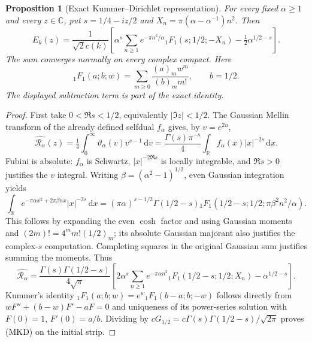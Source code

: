 \documentclass[11pt]{article}
\newtheorem{proposition}[theorem]{Proposition}
\theoremstyle{remark}\newtheorem{remark}[theorem]{Remark}
\newcommand{\R}{\mathbb R}
\newcommand{\C}{\mathbb C}
\newcommand{\dd}{\,\mathrm d}
\begin{document}
\begin{proposition}[Exact Kummer--Dirichlet representation]
\label{prop:mehler-kummer}
For every fixed $\alpha\ge1$ and every $z\in\C$, put
$s=1/4-iz/2$ and $X_n=\pi(\alpha-\alpha^{-1})n^2$. Then
\[
 E_k(z)=\frac1{\sqrt2c(k)}
 \left[\alpha^s\sum_{n\ge1}e^{-\pi n^2/\alpha}
   {}_1F_1(s;1/2;-X_n)-\tfrac12\alpha^{1/2-s}\right]. \tag{MKD}
\]
The sum converges normally on every complex compact. Here
\[
 {}_1F_1(a;b;w)=\sum_{m\ge0}\frac{(a)_m w^m}{(b)_m m!},
 \qquad b=1/2.
\]
The displayed subtraction term is part of the exact identity.
\end{proposition}
\begin{proof}
First take $0<\Re s<1/2$, equivalently $|\Im z|<1/2$.
The Gaussian Mellin transform of the already defined selfdual
$f_\alpha$ gives, by $v=e^{2u}$,
\[
 \widehat{\mathcal R_\alpha}(z)
 =\tfrac14\int_0^\infty\vartheta_\alpha(v)v^{s-1}\dd v
 =\frac{\Gamma(s)\pi^{-s}}4
                     \int_\R f_\alpha(x)|x|^{-2s}\dd x .
\]
Fubini is absolute: $f_\alpha$ is Schwartz, $|x|^{-2\Re s}$ is
locally integrable, and $\Re s>0$ justifies the $v$ integral.
Writing $\beta=(\alpha^2-1)^{1/2}$, even Gaussian integration yields
\[
 \int_\R e^{-\pi\alpha x^2+2\pi\beta nx}|x|^{-2s}\dd x
 =(\pi\alpha)^{s-1/2}\Gamma(1/2-s)
       {}_1F_1(1/2-s;1/2;\pi\beta^2n^2/\alpha).
\]
This follows by expanding the even $\cosh$ factor and using Gaussian
moments and $(2m)!=4^m m!(1/2)_m$; its absolute Gaussian majorant
also justifies the complex-$s$ computation. Completing squares
in the original Gaussian sum justifies summing the moments.
Thus
\[
 \widehat{\mathcal R_\alpha}
 =\frac{\Gamma(s)\Gamma(1/2-s)}{4\sqrt\pi}
 \left[2\alpha^s\sum_{n\ge1}e^{-\pi\alpha n^2}
       {}_1F_1(1/2-s;1/2;X_n)-\alpha^{1/2-s}\right].
\]
Kummer's identity
\({}_1F_1(a;b;w)=e^w{}_1F_1(b-a;b;-w)\) follows directly from
$wF''+(b-w)F'-aF=0$ and uniqueness of its power-series solution
with $F(0)=1$, $F'(0)=a/b$. Dividing by
$cG_{1/2}=c\Gamma(s)\Gamma(1/2-s)/\sqrt{2\pi}$ proves (MKD)
on the initial strip.


\end{proof}
\end{document}
